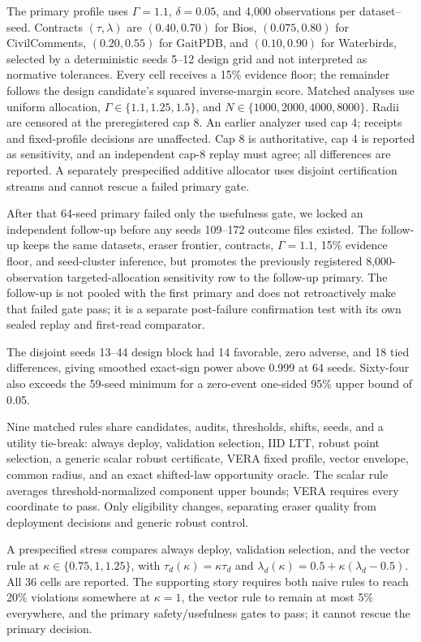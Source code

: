 The primary profile uses $\Gamma=1.1$, $\delta=0.05$, and 4,000 observations
per dataset--seed. Contracts $(\tau,\lambda)$ are $(0.40,0.70)$ for Bios,
$(0.075,0.80)$ for CivilComments, $(0.20,0.55)$ for GaitPDB, and $(0.10,0.90)$
for Waterbirds, selected by a deterministic seeds 5--12 design grid and not
interpreted as normative tolerances. Every cell receives a 15\% evidence floor;
the remainder follows the design candidate's squared inverse-margin score.
Matched analyses use uniform allocation, $\Gamma\in\{1.1,1.25,1.5\}$, and
$N\in\{1000,2000,4000,8000\}$. Radii are censored at the preregistered cap 8.
An earlier analyzer used cap 4; receipts and fixed-profile decisions are
unaffected. Cap 8 is authoritative, cap 4 is reported as sensitivity, and an
independent cap-8 replay must agree; all differences are reported. A separately prespecified additive
allocator uses disjoint certification streams and cannot rescue a failed
primary gate.

After that 64-seed primary failed only the usefulness gate, we locked an
independent follow-up before any seeds 109--172 outcome files existed. The
follow-up keeps the same datasets, eraser frontier, contracts, $\Gamma=1.1$,
15\% evidence floor, and seed-cluster inference, but promotes the previously
registered 8,000-observation targeted-allocation sensitivity row to the
follow-up primary. The follow-up is not pooled with the first primary and does
not retroactively make that failed gate pass; it is a separate post-failure
confirmation test with its own sealed replay and first-read comparator.

The disjoint seeds 13--44 design block had 14 favorable, zero adverse, and 18
tied differences, giving smoothed exact-sign power above 0.999 at 64 seeds.
Sixty-four also exceeds the 59-seed minimum for a zero-event one-sided 95\%
upper bound of 0.05.

Nine matched rules share candidates, audits, thresholds, shifts, seeds, and a
utility tie-break: always deploy, validation selection, IID LTT, robust point
selection, a generic scalar robust certificate, VERA fixed profile, vector
envelope, common radius, and an exact shifted-law opportunity oracle. The
scalar rule averages threshold-normalized component upper bounds; VERA requires
every coordinate to pass. Only eligibility changes, separating eraser quality
from deployment decisions and generic robust control.

A prespecified stress compares always deploy, validation selection, and the
vector rule at $\kappa\in\{0.75,1,1.25\}$, with
$\tau_d(\kappa)=\kappa\tau_d$ and
$\lambda_d(\kappa)=0.5+\kappa(\lambda_d-0.5)$. All 36 cells are reported. The
supporting story requires both naive rules to reach 20\% violations somewhere
at $\kappa=1$, the vector rule to remain at most 5\% everywhere, and the primary
safety/usefulness gates to pass; it cannot rescue the primary decision.

